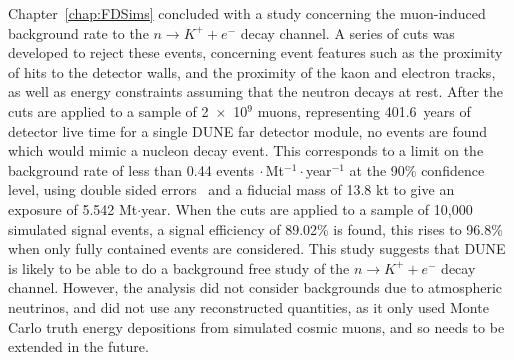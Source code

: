 Chapter~\ref{chap:FDSims} concluded with a study concerning the muon-induced background rate to the $n \rightarrow K^{+} + e^{-}$ decay channel. A series of cuts was developed to reject these events, concerning event features such as the proximity of hits to the detector walls, and the proximity of the kaon and electron tracks, as well as energy constraints assuming that the neutron decays at rest. After the cuts are applied to a sample of 2~$\times$~10$^{9}$ muons, representing 401.6~years of detector live time for a single DUNE far detector module, no events are found which would mimic a nucleon decay event. This corresponds to a limit on the background rate of less than 0.44 events$~\cdot$Mt$^{-1}\cdot$year$^{-1}$ at the 90\% confidence level, using double sided errors~\citep{PDGReview} and a fiducial mass of 13.8 kt to give an exposure of 5.542 Mt$\cdot$year. When the cuts are applied to a sample of 10,000 simulated signal events, a signal efficiency of 89.02\% is found, this rises to 96.8\% when only fully contained events are considered. This study suggests that DUNE is likely to be able to do a background free study of the $n \rightarrow K^{+} + e^{-}$ decay channel. However, the analysis did not consider backgrounds due to atmospheric neutrinos, and did not use any reconstructed quantities, as it only used Monte Carlo truth energy depositions from simulated cosmic muons, and so needs to be extended in the future. \\
